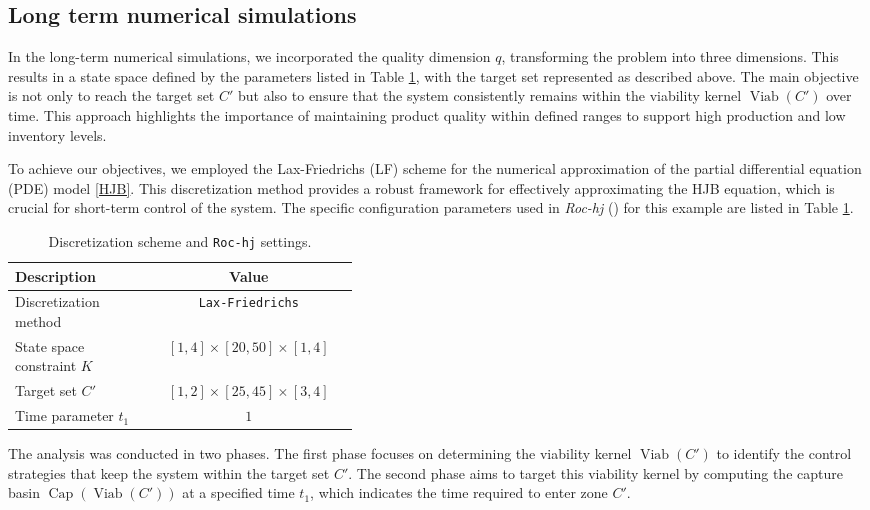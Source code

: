 \documentclass[]{interact}
\theoremstyle{plain}%
\theoremstyle{definition}
\theoremstyle{remark}
\begin{document}
\subsection{Long term numerical simulations}\label{longnumeric}

In the long-term numerical simulations, we incorporated the quality dimension \( q \), transforming the problem into three dimensions. This results in a state space defined by the parameters listed in Table \ref{Tab.2}, with the target set represented as described above. The main objective is not only to reach the target set \( C' \) but also to ensure that the system consistently remains within the viability kernel \( \operatorname{Viab}(C') \) over time. This approach highlights the importance of maintaining product quality within defined ranges to support high production and low inventory levels.

To achieve our objectives, we employed the Lax-Friedrichs (LF) scheme for the numerical approximation of the partial differential equation (PDE) model \eqref{HJB}. This discretization method provides a robust framework for effectively approximating the HJB equation, which is crucial for short-term control of the system. The specific configuration parameters used in \textit{Roc-hj} (\cite{RocHJ}) for this example are listed in Table \ref{Tab.2}.

\begin{table}[htbp]
\centering
\caption{Discretization scheme and {\tt Roc-hj} settings.}
\label{Tab.2}
\begin{tabular}{p{0.4\linewidth}c}
\hline
\textbf{Description} & \textbf{Value} \\
\hline
Discretization method & {\tt Lax-Friedrichs} \\
State space constraint \( K \) & \([1, 4] \times [20, 50] \times [1, 4]\) \\
Target set \( C' \) & \([1, 2] \times [25, 45] \times [3, 4]\) \\
Time parameter \( t_1 \) & \(1\) \\
\hline
\end{tabular}
\end{table}



The analysis was conducted in two phases. The first phase focuses on determining the viability kernel \( \operatorname{Viab}(C') \) to identify the control strategies that keep the system within the target set \( C' \). The second phase aims to target this viability kernel by computing the capture basin \( \operatorname{Cap}(\operatorname{Viab}(C')) \) at a specified time \( t_1 \), which indicates the time required to enter zone \( C' \).
\end{document}

